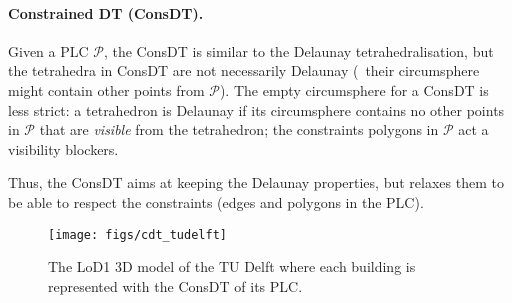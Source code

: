 



%
\paragraph*{Constrained DT (ConsDT).}

Given a PLC $\mathcal{P}$, the ConsDT is similar to the Delaunay tetrahedralisation, but the tetrahedra in ConsDT are not necessarily Delaunay (\ie\ their circumsphere might contain other points from $\mathcal{P}$). 
The empty circumsphere for a ConsDT is less strict: a tetrahedron is Delaunay if its circumsphere contains no other points in $\mathcal{P}$ that are \emph{visible} from the tetrahedron; the constraints polygons in $\mathcal{P}$ act a visibility blockers. 

%

Thus, the ConsDT aims at keeping the Delaunay properties, but relaxes them to be able to respect the constraints (edges and polygons in the PLC).
\begin{figure*}
  \centering
  \texttt{[image: figs/cdt\_tudelft]}
  \caption[A ConsDT of each building of the TU Delft]{The LoD1 3D model of the TU Delft where each building is represented with the ConsDT of its PLC.}%
\label{fig:cdt_tudelft}
\end{figure*}

%


